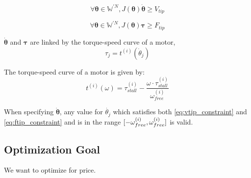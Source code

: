 \documentclass{article}
\begin{document}
\begin{equation}
    \forall \boldsymbol{\theta} \in \mathbb{W}^{\prime N}, J(\boldsymbol{\theta}) \boldsymbol{\dot{\theta}} \geq V_{tip}
    \label{eq:vtip_constraint}
\end{equation}

\begin{equation}
    \forall \boldsymbol{\theta} \in \mathbb{W}^{\prime N}, J(\boldsymbol{\theta}) \boldsymbol{\tau} \geq F_{tip}
    \label{eq:ftip_constraint}
\end{equation}

$\boldsymbol{\dot{{\theta}}}$ and $\boldsymbol{\tau}$ are linked by the torque-speed curve of a motor,
\begin{equation}
    \tau_j = t^{(i)}(\dot{\theta}_j)
\end{equation}

The torque-speed curve of a motor is given by:
\begin{equation}
    t^{(i)}(\omega) = \tau_{stall}^{(i)} - \frac{\omega \cdot \tau_{stall}^{(i)}}{\omega_{free}^{(i)}}
\end{equation}

When specifying $\boldsymbol{\dot{\theta}}$, any value for $\dot{\theta_j}$
which satisfies both \ref{eq:vtip_constraint} and \ref{eq:ftip_constraint} and
is in the range $\interval{-\omega_{free}^{(i)}}{\omega_{free}^{(i)}}$ is
valid.

\FloatBarrier
\subsection{Optimization Goal}

We want to optimize for price.
\end{document}
